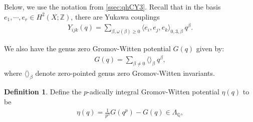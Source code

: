 \documentclass[reqno]{amsart}
\numberwithin{equation}{section}
\numberwithin{equation}{section}
\numberwithin{equation}{section}
\newtheorem{thm}{Theorem}[section]
\theoremstyle{definition}
\newtheorem{defn}[thm]{Definition}
\theoremstyle{remark}
\theoremstyle{remark}
\begin{document}
Below, we use the notation from \cref{ssec:qhCY3}. Recall that in the basis $e_1,\cdots, e_r \in H^2(X;\mathbb{Z})$, there are Yukawa couplings \begin{align} Y_{ijk}(q)=\sum_{\beta,\omega(\beta)\geq 0} \langle e_i,e_j,e_k\rangle _{0,3,\beta}\ q^{\beta}.  \end{align}




We also have the genus zero Gromov-Witten potential $G(q)$ given by: \begin{align} \label{eq:GWpotential} G(q)= \sum_{\beta \neq 0} \langle \rangle_\beta \ q^{\beta}, \end{align} where $\langle \rangle_\beta$ denote zero-pointed genus zero Gromov-Witten invariants. 

\begin{defn} Define the $p$-adically integral Gromov-Witten potential $\eta(q)$ to be \begin{align} \label{eq:removepdivisors} \eta(q)= \frac{1}{p^3}G(q^p)-G(q) \in \Lambda_{\mathbb{Q}}, \end{align}  \end{defn}
\end{document}
